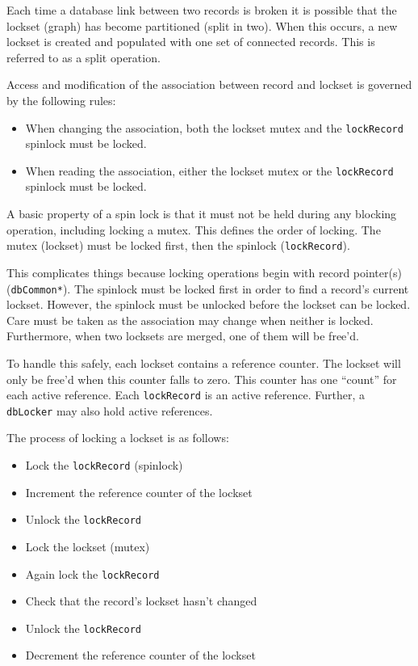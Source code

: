 Each time a database link between two records is broken it is possible that the lockset (graph)
has become partitioned (split in two).
When this occurs, a new lockset is created and populated with one set of connected records.
This is referred to as a split operation.

Access and modification of the association between record and lockset is governed by the following rules:

\begin{itemize}
\item When changing the association, both the lockset mutex and the \verb|lockRecord| spinlock must be locked.
\item When reading the association, either the lockset mutex or the \verb|lockRecord| spinlock must be locked.
\end{itemize}

A basic property of a spin lock is that it must not be held during any blocking operation, including locking a mutex.
This defines the order of locking.
The mutex (lockset) must be locked first, then the spinlock (\verb|lockRecord|).

This complicates things because locking operations begin with record pointer(s) (\verb|dbCommon*|).
The spinlock must be locked first in order to find a record's current lockset.
However, the spinlock must be unlocked before the lockset can be locked.
Care must be taken as the association may change when neither is locked.
Furthermore, when two locksets are merged, one of them will be free'd.

To handle this safely, each lockset contains a reference counter.
The lockset will only be free'd when this counter falls to zero.
This counter has one ``count'' for each active reference.
Each \verb|lockRecord| is an active reference.
Further, a \verb|dbLocker| may also hold active references.

The process of locking a lockset is as follows:

\begin{itemize}
\item Lock the \verb|lockRecord| (spinlock)
\item Increment the reference counter of the lockset
\item Unlock the \verb|lockRecord|
\item Lock the lockset (mutex)
\item Again lock the \verb|lockRecord|
\item Check that the record's lockset hasn't changed
\item Unlock the \verb|lockRecord|
\item Decrement the reference counter of the lockset
\end{itemize}

